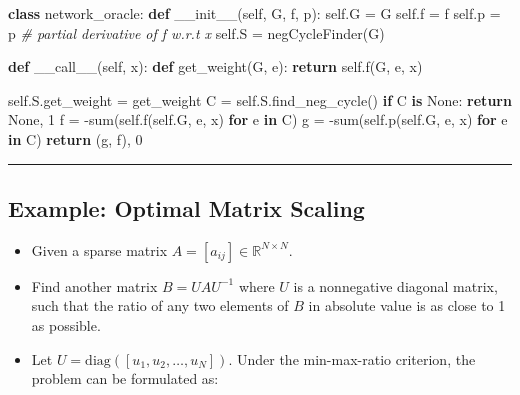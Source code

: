 \documentclass[]{article}
\newenvironment{Shaded}{}{}
\newcommand{\BuiltInTok}[1]{#1}
\newcommand{\CommentTok}[1]{\textcolor[rgb]{0.38,0.63,0.69}{\textit{#1}}}
\newcommand{\ControlFlowTok}[1]{\textcolor[rgb]{0.00,0.44,0.13}{\textbf{#1}}}
\newcommand{\DecValTok}[1]{\textcolor[rgb]{0.25,0.63,0.44}{#1}}
\newcommand{\FunctionTok}[1]{\textcolor[rgb]{0.02,0.16,0.49}{#1}}
\newcommand{\KeywordTok}[1]{\textcolor[rgb]{0.00,0.44,0.13}{\textbf{#1}}}
\newcommand{\NormalTok}[1]{#1}
\newcommand{\OperatorTok}[1]{\textcolor[rgb]{0.40,0.40,0.40}{#1}}
\newcommand{\VariableTok}[1]{\textcolor[rgb]{0.10,0.09,0.49}{#1}}
\begin{document}
\begin{Shaded}
\begin{Highlighting}[]
\KeywordTok{class}\NormalTok{ network_oracle:}
    \KeywordTok{def} \FunctionTok{__init__}\NormalTok{(}\VariableTok{self}\NormalTok{, G, f, p):}
        \VariableTok{self}\NormalTok{.G }\OperatorTok{=}\NormalTok{ G}
        \VariableTok{self}\NormalTok{.f }\OperatorTok{=}\NormalTok{ f}
        \VariableTok{self}\NormalTok{.p }\OperatorTok{=}\NormalTok{ p  }\CommentTok{# partial derivative of f w.r.t x}
        \VariableTok{self}\NormalTok{.S }\OperatorTok{=}\NormalTok{ negCycleFinder(G)}

    \KeywordTok{def} \FunctionTok{__call__}\NormalTok{(}\VariableTok{self}\NormalTok{, x):}
        \KeywordTok{def}\NormalTok{ get_weight(G, e):}
            \ControlFlowTok{return} \VariableTok{self}\NormalTok{.f(G, e, x)}

        \VariableTok{self}\NormalTok{.S.get_weight }\OperatorTok{=}\NormalTok{ get_weight}
\NormalTok{        C }\OperatorTok{=} \VariableTok{self}\NormalTok{.S.find_neg_cycle()}
        \ControlFlowTok{if}\NormalTok{ C }\KeywordTok{is} \VariableTok{None}\NormalTok{:}
            \ControlFlowTok{return} \VariableTok{None}\NormalTok{, }\DecValTok{1}
\NormalTok{        f }\OperatorTok{=} \OperatorTok{-}\BuiltInTok{sum}\NormalTok{(}\VariableTok{self}\NormalTok{.f(}\VariableTok{self}\NormalTok{.G, e, x) }\ControlFlowTok{for}\NormalTok{ e }\KeywordTok{in}\NormalTok{ C)}
\NormalTok{        g }\OperatorTok{=} \OperatorTok{-}\BuiltInTok{sum}\NormalTok{(}\VariableTok{self}\NormalTok{.p(}\VariableTok{self}\NormalTok{.G, e, x) }\ControlFlowTok{for}\NormalTok{ e }\KeywordTok{in}\NormalTok{ C)}
        \ControlFlowTok{return}\NormalTok{ (g, f), }\DecValTok{0}
\end{Highlighting}
\end{Shaded}

\begin{center}\rule{0.5\linewidth}{\linethickness}\end{center}

\hypertarget{example-optimal-matrix-scaling}{%
\subsection{Example: Optimal Matrix
Scaling}\label{example-optimal-matrix-scaling}}

\begin{itemize}
\item
  Given a sparse matrix \(A = [a_{ij}] \in \mathbb{R}^{N\times N}\).
\item
  Find another matrix \(B = U A U^{-1}\) where \(U\) is a nonnegative
  diagonal matrix, such that the ratio of any two elements of \(B\) in
  absolute value is as close to 1 as possible.
\item
  Let \(U = \mathrm{diag}([u_1, u_2, \ldots, u_N])\). Under the
  min-max-ratio criterion, the problem can be formulated as:
\end{itemize}
\end{document}

